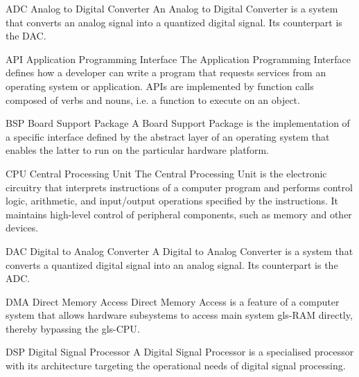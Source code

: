 \usepackage[xindy, nopostdot, numberedsection, style=super, section, toc, acronyms, nogroupskip]{glossaries}
\usepackage{xparse}

\setlength{\glsdescwidth}{0.8\textwidth}
\renewcommand{\glsnamefont}[1]{\textbf{#1}}

 {
  \makeglossaries
}


%
  {ADC}%
  {Analog to Digital Converter}%
  {An Analog to Digital Converter is a system that converts an analog signal
   into a quantized digital signal. Its counterpart is the \gls{DAC}.}%

%
  {API}%
  {Application Programming Interface}%
  {The Application Programming Interface defines how a developer can write
   a program that requests services from an operating system or application.
   \glspl{API} are implemented by function calls composed of verbs and nouns,
   i.e. a function to execute on an object.}%

%
  {BSP}%
  {Board Support Package}%
  {A Board Support Package is the implementation of a specific interface defined
   by the abstract layer of an operating system that enables the latter to run
   on the particular hardware platform.}%

%
  {CPU}%
  {Central Processing Unit}%
  {The Central Processing Unit is the electronic circuitry that interprets
  instructions of a computer program and performs control logic, arithmetic,
  and input/output operations specified by the instructions. It maintains
  high-level control of peripheral components, such as memory and other devices.}%

%
  {DAC}%
  {Digital to Analog Converter}%
  {A Digital to Analog Converter is a system that converts a quantized digital
   signal into an analog signal. Its counterpart is the \gls{ADC}.}%

%
  {DMA}%
  {Direct Memory Access}%
  {Direct Memory Access is a feature of a computer system that allows hardware
   subsystems to access main system \gls{gls-RAM} directly, thereby bypassing
   the \gls{gls-CPU}.}%

%
  {DSP}%
  {Digital Signal Processor}%
  {A Digital Signal Processor is a specialised processor with its architecture %
   targeting the operational needs of digital signal processing.}%

